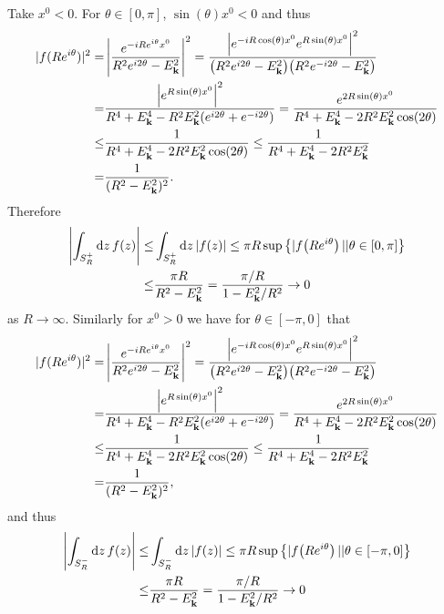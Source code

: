 \documentclass{article}
\begin{document}
Take $x^0<0$. For $\theta\in[0,\pi]$, $\sin(\theta)x^0<0$ and thus
\begin{align}
\begin{split}
|f(Re^{i\theta})|^2=&\left|\frac{e^{-iRe^{i\theta}x^0}}{R^2e^{i2\theta}-E_{\vb{k}}^2}\right|^2=\frac{\left|e^{-iR\cos(\theta)x^0}e^{R\sin(\theta)x^0}\right|^2}{\qty(R^2e^{i2\theta}-E_{\vb{k}}^2)\qty(R^2e^{-i2\theta}-E_{\vb{k}}^2)}\\
=&\frac{\left|e^{R\sin(\theta)x^0}\right|^2}{R^4+E_{\vb{k}}^4-R^2E_{\vb{k}}^2(e^{i2\theta}+e^{-i2\theta})}=\frac{e^{2R\sin(\theta)x^0}}{R^4+E_{\vb{k}}^4-2R^2E_{\vb{k}}^2\cos(2\theta)}\\
\leq&\frac{1}{R^4+E_{\vb{k}}^4-2R^2E_{\vb{k}}^2\cos(2\theta)}\leq\frac{1}{R^4+E_{\vb{k}}^4-2R^2E_{\vb{k}}^2}\\
=&\frac{1}{(R^2-E_{\vb{k}}^2)^2}.
\end{split}
\end{align}
Therefore
\begin{align}
\begin{split}
\left|\int_{S^+_R}\dd{z}f(z)\right|\leq&\int_{S^+_R}\dd{z}\left|f(z)\right|\leq\pi R\sup\qty{|f\qty(Re^{i\theta})||\theta\in[0,\pi]}\\
\leq&\frac{\pi R}{R^2-E_{\vb{k}}^2}=\frac{\pi/R}{1-E_{\vb{k}}^2/R^2}\rightarrow 0
\end{split}
\end{align}
as $R\rightarrow\infty$. Similarly for $x^0>0$ we have for $\theta\in[-\pi,0]$ that
\begin{align}
\begin{split}
|f(Re^{i\theta})|^2=&\left|\frac{e^{-iRe^{i\theta}x^0}}{R^2e^{i2\theta}-E_{\vb{k}}^2}\right|^2=\frac{\left|e^{-iR\cos(\theta)x^0}e^{R\sin(\theta)x^0}\right|^2}{\qty(R^2e^{i2\theta}-E_{\vb{k}}^2)\qty(R^2e^{-i2\theta}-E_{\vb{k}}^2)}\\
=&\frac{\left|e^{R\sin(\theta)x^0}\right|^2}{R^4+E_{\vb{k}}^4-R^2E_{\vb{k}}^2(e^{i2\theta}+e^{-i2\theta})}=\frac{e^{2R\sin(\theta)x^0}}{R^4+E_{\vb{k}}^4-2R^2E_{\vb{k}}^2\cos(2\theta)}\\
\leq&\frac{1}{R^4+E_{\vb{k}}^4-2R^2E_{\vb{k}}^2\cos(2\theta)}\leq\frac{1}{R^4+E_{\vb{k}}^4-2R^2E_{\vb{k}}^2}\\
=&\frac{1}{(R^2-E_{\vb{k}}^2)^2},
\end{split}
\end{align}
and thus
\begin{align}
\begin{split}
\left|\int_{S^-_R}\dd{z}f(z)\right|\leq&\int_{S^-_R}\dd{z}\left|f(z)\right|\leq\pi R\sup\qty{|f\qty(Re^{i\theta})||\theta\in[-\pi,0]}\\
\leq&\frac{\pi R}{R^2-E_{\vb{k}}^2}=\frac{\pi/R}{1-E_{\vb{k}}^2/R^2}\rightarrow 0
\end{split}
\end{align}
\end{document}
